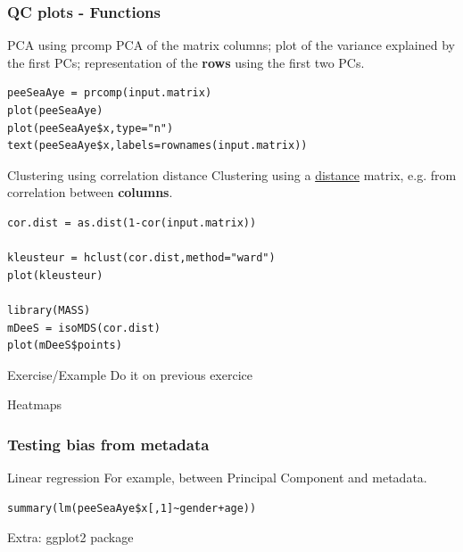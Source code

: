 \documentclass[10pt]{beamer}
\newenvironment{xframe}[2][]
  {\begin{frame}[fragile,environment=xframe,#1]
  \frametitle{#2}}
  {\end{frame}}
\begin{document}
\begin{xframe}[shrink=10]{QC plots - Functions}
  \begin{block}{PCA using {\sf prcomp}}
    PCA of the matrix columns; plot of the variance explained by the first PCs; representation of the {\bf rows} using the first two PCs.
\begin{verbatim}
peeSeaAye = prcomp(input.matrix)
plot(peeSeaAye)
plot(peeSeaAye$x,type="n")
text(peeSeaAye$x,labels=rownames(input.matrix))
\end{verbatim}  
  \end{block}
  \begin{block}{Clustering using correlation distance}
    Clustering using a \uline{distance} matrix, e.g. from correlation between {\bf columns}.
\begin{verbatim}
cor.dist = as.dist(1-cor(input.matrix))

kleusteur = hclust(cor.dist,method="ward")
plot(kleusteur)

library(MASS)
mDeeS = isoMDS(cor.dist)
plot(mDeeS$points)
\end{verbatim}  
  \end{block}
\end{xframe}

\begin{frame}{Exercise/Example}
  Do it on previous exercice
\end{frame}

\begin{frame}{Heatmaps}
  
\end{frame}

\begin{xframe}{Testing bias from metadata}
  \begin{block}{Linear regression}
    For example, between Principal Component and metadata. 
  \end{block}
  \begin{exampleblock}{}
\begin{verbatim}
summary(lm(peeSeaAye$x[,1]~gender+age))
\end{verbatim}  
  \end{exampleblock}
\end{xframe}

\begin{frame}{Extra: ggplot2 package}
  
\end{frame}
\end{document}
